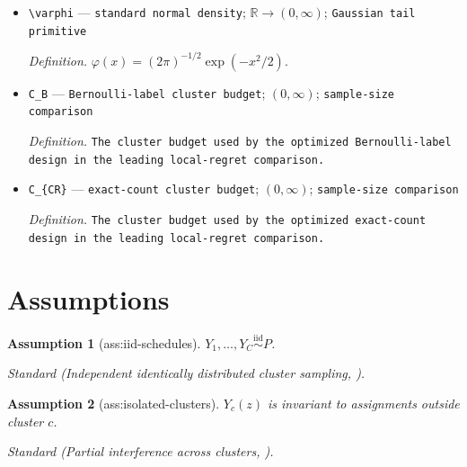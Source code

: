 \documentclass{article}
\newtheorem{assumption}{Assumption}
\begin{document}
\begin{itemize}
  \par\smallskip\noindent\emph{Definition.} \texttt{The certified hierarchical noncompact routine on a declared candidate face A:\allowbreak{} it uses an independent Gaussian screen–decision split,\allowbreak{} applies certified compact quotient selectors to every retained nonempty subset,\allowbreak{} and certifies the outer design over the Bernoulli hit polytope or exact-\allowbreak{}count simplex by rational branch-\allowbreak{}and-\allowbreak{}bound. Global candidate adaptation takes the full face with positive information for every candidate;\allowbreak{} an action-\allowbreak{}relevant zero rate has extended value +\allowbreak{}infinity.}
  \item \texttt{\textbackslash{}\allowbreak{}varphi} --- \texttt{standard normal density}; \(\mathbb R\to(0,\infty)\); \texttt{Gaussian tail primitive}
  \par\smallskip\noindent\emph{Definition.} \(\varphi(x)=(2\pi)^{-1/2}\exp(-x^2/2)\).
  \item \texttt{C\_\allowbreak{}B} --- \texttt{Bernoulli-\allowbreak{}label cluster budget}; \((0,\infty)\); \texttt{sample-\allowbreak{}size comparison}
  \par\smallskip\noindent\emph{Definition.} \texttt{The cluster budget used by the optimized Bernoulli-\allowbreak{}label design in the leading local-\allowbreak{}regret comparison.}
  \item \texttt{C\_\allowbreak{}\{CR\}\allowbreak{}} --- \texttt{exact-\allowbreak{}count cluster budget}; \((0,\infty)\); \texttt{sample-\allowbreak{}size comparison}
  \par\smallskip\noindent\emph{Definition.} \texttt{The cluster budget used by the optimized exact-\allowbreak{}count design in the leading local-\allowbreak{}regret comparison.}
\end{itemize}

\section{Assumptions}

\begin{assumption}[ass:iid-schedules]\label{ass:iid-schedules}
\(Y_1,\ldots,Y_C\stackrel{\mathrm{iid}}{\sim}P\).
\par\smallskip\noindent\emph{Standard} (Independent identically distributed cluster sampling, \cite{HanOwusuShin2026}).
\end{assumption}

\begin{assumption}[ass:isolated-clusters]\label{ass:isolated-clusters}
\(Y_c(z)\) is invariant to assignments outside cluster \(c\).
\par\smallskip\noindent\emph{Standard} (Partial interference across clusters, \cite{HudgensHalloran2008}).
\end{assumption}
\end{document}

